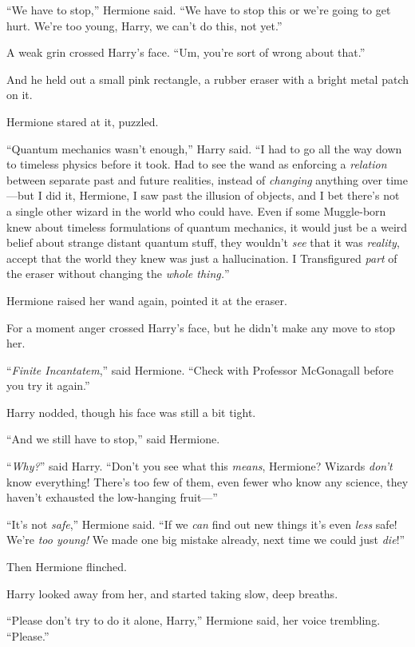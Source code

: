 “We have to stop,” Hermione said. “We have to stop this or we’re going to get hurt. We’re too young, Harry, we can’t do this, not yet.”

A weak grin crossed Harry’s face. “Um, you’re sort of wrong about that.”

And he held out a small pink rectangle, a rubber eraser with a bright metal patch on it.

Hermione stared at it, puzzled.

“Quantum mechanics wasn’t enough,” Harry said. “I had to go all the way down to timeless physics before it took. Had to see the wand as enforcing a \emph{relation} between separate past and future realities, instead of \emph{changing} anything over time—but I did it, Hermione, I saw past the illusion of objects, and I bet there’s not a single other wizard in the world who could have. Even if some Muggle-born knew about timeless formulations of quantum mechanics, it would just be a weird belief about strange distant quantum stuff, they wouldn’t \emph{see} that it was \emph{reality}, accept that the world they knew was just a hallucination. I Transfigured \emph{part} of the eraser without changing the \emph{whole thing.}”

Hermione raised her wand again, pointed it at the eraser.

For a moment anger crossed Harry’s face, but he didn’t make any move to stop her.

“\emph{Finite Incantatem},” said Hermione. “Check with Professor McGonagall before you try it again.”

Harry nodded, though his face was still a bit tight.

“And we still have to stop,” said Hermione.

“\emph{Why?}” said Harry. “Don’t you see what this \emph{means}, Hermione? Wizards \emph{don’t} know everything! There’s too few of them, even fewer who know any science, they haven’t exhausted the low-hanging fruit—”

“It’s not \emph{safe},” Hermione said. “If we \emph{can} find out new things it’s even \emph{less} safe! We’re \emph{too young!} We made one big mistake already, next time we could just \emph{die}!”

Then Hermione flinched.

Harry looked away from her, and started taking slow, deep breaths.

“Please don’t try to do it alone, Harry,” Hermione said, her voice trembling. “Please.”

